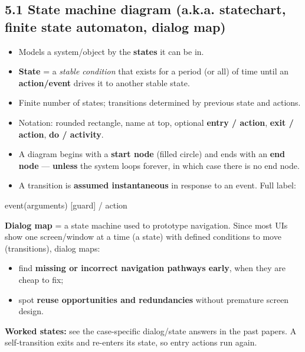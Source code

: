 \begin{studycolumns}
\vspace{0pt}



\subsection*{5.1 State machine diagram (a.k.a. statechart, finite state automaton, \textbf{dialog map})}
\begin{itemize}
\item Models a system/\allowbreak{}object by the \textbf{states} it can be in.
\item \textbf{State} = a \emph{stable condition} that exists for a period (or all) of time until an \textbf{action/\allowbreak{}event} drives it to another stable state.
\item Finite number of states; transitions determined by previous state and actions.
\item Notation: rounded rectangle, name at top, optional \textbf{entry /\allowbreak{} action}, \textbf{exit /\allowbreak{} action}, \textbf{do /\allowbreak{} activity}.
\item A diagram begins with a \textbf{start node} (filled circle) and ends with an \textbf{end node} --- \textbf{unless} the system loops forever, in which case there is no end node.
\item A transition is \textbf{assumed instantaneous} in response to an event. Full label:
\end{itemize}

\begin{ReferenceCode}
event(arguments) [guard] / action
\end{ReferenceCode}
\textbf{Dialog map} = a state machine used to prototype navigation. Since most UIs show one screen/\allowbreak{}window at a time (a state) with defined conditions to move (transitions), dialog maps:

\begin{itemize}
\item find \textbf{missing or incorrect navigation pathways early}, when they are cheap to fix;
\item spot \textbf{reuse opportunities and redundancies} without premature screen design.
\end{itemize}
\textbf{Worked states:} see the case-specific dialog/state answers in the past papers. A self-transition exits and re-enters its state, so entry actions run again.


\end{studycolumns}
